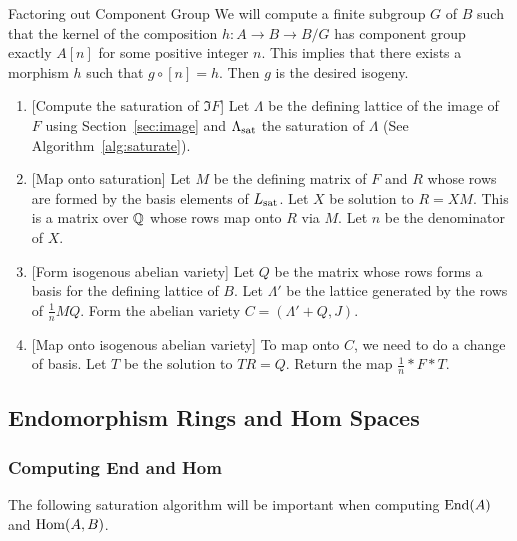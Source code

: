 \documentclass{article}
\begin{document}
\begin{algorithm}{Factoring out Component Group}
    We will compute a finite subgroup $G$ of $B$ such that the kernel of the
    composition $h:A\to B\to B/G$ has component group exactly $A[n]$ for some
    positive integer $n$. This implies that there exists a morphism $h$ such
    that $g \circ [n] = h$. Then $g$ is the desired isogeny.
    \begin{enumerate}
        \item{} [Compute the saturation of $\Im F$]
            Let $\Lambda$ be the defining lattice of the image of
            $F$ using Section~\ref{sec:image} and $\Lambda_{\mathrm{sat}}$ the
            saturation of $\Lambda$ (See Algorithm~\ref{alg:saturate}).
        \item{} [Map onto saturation]
            Let $M$ be the defining matrix of $F$ and $R$ whose rows are formed
            by the basis elements of $L_{\mathrm{sat}}$. Let $X$ be solution to $R=XM$.
            This is a matrix over $\mathbb{Q}$ whose rows map onto $R$ via $M$. Let
            $n$ be the denominator of $X$.
        \item{} [Form isogenous abelian variety]
            Let $Q$ be the matrix whose rows forms a basis for the defining
            lattice of $B$. Let $\Lambda'$ be the lattice generated by the rows
            of $\frac{1}{n}MQ$. Form the abelian variety $C=(\Lambda'+Q, J)$.
        \item{} [Map onto isogenous abelian variety]
            To map onto $C$, we need to do a change of basis. Let $T$ be the
            solution to $TR=Q$. Return the map $\frac{1}{n}*F*T$.
    \end{enumerate}
\end{algorithm}


\subsection{Endomorphism Rings and Hom Spaces}

\subsubsection{Computing End and Hom}

The following saturation algorithm will be important
when computing $\operatorname{End}(A)$ and $\operatorname{Hom}(A,B)$.
\end{document}
